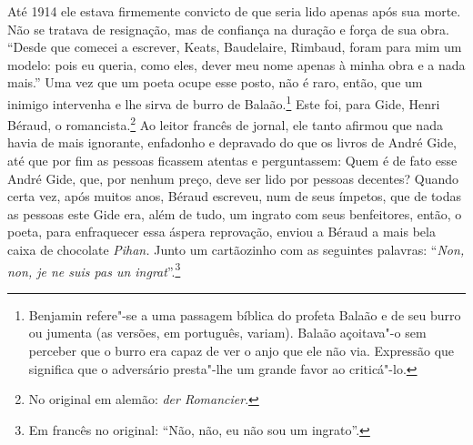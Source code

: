 Até 1914 ele estava firmemente convicto de que seria lido apenas após
sua morte. Não se tratava de resignação, mas de confiança na duração e
força de sua obra. ``Desde que comecei a escrever, Keats, Baudelaire,
Rimbaud, foram para mim um modelo: pois eu queria, como eles, dever meu
nome apenas à minha obra e a nada mais.'' Uma vez que um poeta ocupe
esse posto, não é raro, então, que um inimigo intervenha e lhe sirva de
burro de Balaão.\footnote{Benjamin refere"-se a uma passagem bíblica do profeta Balaão e de seu burro ou jumenta (as versões, em português, variam). Balaão açoitava"-o sem perceber que o burro era capaz de ver o anjo que ele não via. Expressão que significa que o adversário presta"-lhe um grande favor ao criticá"-lo. \versal{[N.~T.]}} Este foi, para Gide, Henri Béraud, o romancista.\footnote{No original em alemão: \emph{der Romancier}. \versal{[N.~T.]}} Ao leitor francês de jornal, ele tanto afirmou que nada
havia de mais ignorante, enfadonho e depravado do que os livros de André
Gide, até que por fim as pessoas ficassem atentas e perguntassem: Quem é
de fato esse André Gide, que, por nenhum preço, deve ser lido por
pessoas decentes? Quando certa vez, após muitos anos, Béraud escreveu,
num de seus ímpetos, que de todas as pessoas este Gide era, além de
tudo, um ingrato com seus benfeitores, então, o poeta, para enfraquecer
essa áspera reprovação, enviou a Béraud a mais bela caixa de chocolate
\emph{Pihan.} Junto um cartãozinho com as seguintes palavras:
``\emph{Non, non, je ne suis pas un ingrat}''.\footnote{Em francês no original: ``Não,
  não, eu não sou um ingrato''. \versal{[N.~T.]}}

